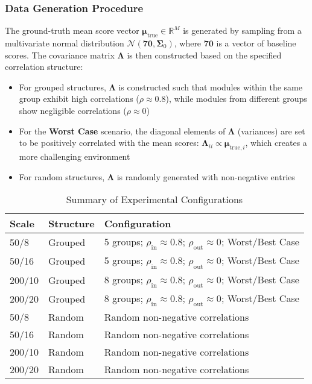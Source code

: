 \documentclass[opre,sglanonrev]{informs4}
\begin{document}
\subsubsection{Data Generation Procedure}
The ground-truth mean score vector $\boldsymbol{\mu}_{\text{true}} \in \mathbb{R}^M$ is generated by sampling from a multivariate normal distribution $\mathcal{N}(\mathbf{70}, \mathbf{\Sigma}_0)$, where $\mathbf{70}$ is a vector of baseline scores. The covariance matrix $\mathbf{\Lambda}$ is then constructed based on the specified correlation structure:
\begin{itemize}
    \item For grouped structures, $\mathbf{\Lambda}$ is constructed such that modules within the same group exhibit high correlations ($\rho \approx 0.8$), while modules from different groups show negligible correlations ($\rho \approx 0$)
    \item For the \textbf{Worst Case} scenario, the diagonal elements of $\mathbf{\Lambda}$ (variances) are set to be positively correlated with the mean scores: $\mathbf{\Lambda}_{ii} \propto \boldsymbol{\mu}_{\text{true},i}$, which creates a more challenging environment
    \item For random structures, $\mathbf{\Lambda}$ is randomly generated with non-negative entries
\end{itemize}

\begin{table}[htbp]
\centering
\caption{Summary of Experimental Configurations}
\label{tab:exp_config}
\begin{tabular}{p{2cm}p{3cm}p{8cm}}
\hline
\textbf{Scale} & \textbf{Structure} & \textbf{Configuration} \\
\hline
50/8 & Grouped & 5 groups; $\rho_{\text{in}}\approx0.8$; $\rho_{\text{out}}\approx0$; Worst/Best Case \\
50/16 & Grouped & 5 groups; $\rho_{\text{in}}\approx0.8$; $\rho_{\text{out}}\approx0$; Worst/Best Case \\
200/10 & Grouped & 8 groups; $\rho_{\text{in}}\approx0.8$; $\rho_{\text{out}}\approx0$; Worst/Best Case \\
200/20 & Grouped & 8 groups; $\rho_{\text{in}}\approx0.8$; $\rho_{\text{out}}\approx0$; Worst/Best Case \\
\hline
50/8 & Random & Random non-negative correlations \\
50/16 & Random & Random non-negative correlations \\
200/10 & Random & Random non-negative correlations \\
200/20 & Random & Random non-negative correlations \\
\hline
\end{tabular}
\end{table}
\end{document}
